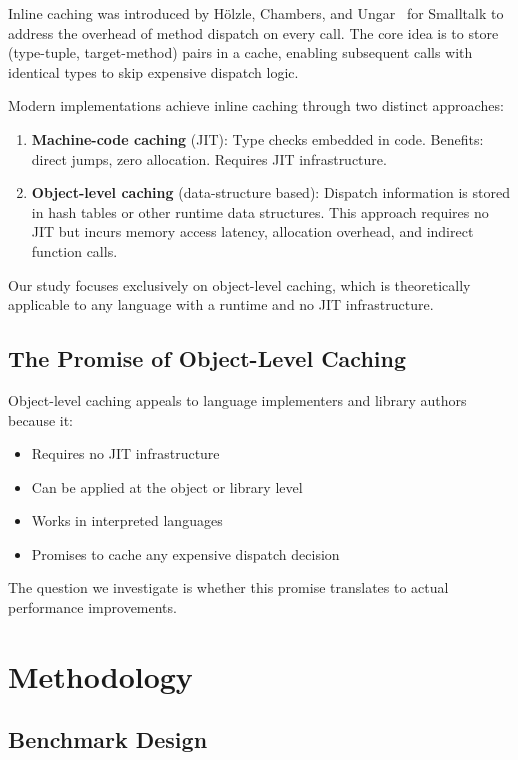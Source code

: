 \documentclass[sigplan,final]{acmart}
\begin{document}
Inline caching was introduced by Hölzle, Chambers, and Ungar~\cite{hoelzle1991optimizing}
for Smalltalk to address the overhead of method dispatch on every call. The core idea is to
store (type-tuple, target-method) pairs in a cache, enabling subsequent calls with identical
types to skip expensive dispatch logic.

Modern implementations achieve inline caching through two distinct approaches:

\begin{enumerate}
  \item \textbf{Machine-code caching} (JIT): Type checks embedded in code. Benefits: direct
    jumps, zero allocation. Requires JIT infrastructure.

  \item \textbf{Object-level caching} (data-structure based): Dispatch information is stored
    in hash tables or other runtime data structures. This approach requires no JIT but incurs
    memory access latency, allocation overhead, and indirect function calls.
\end{enumerate}

Our study focuses exclusively on object-level caching, which is theoretically applicable to any
language with a runtime and no JIT infrastructure.

\subsection{The Promise of Object-Level Caching}

Object-level caching appeals to language implementers and library authors because it:
\begin{itemize}
  \item Requires no JIT infrastructure
  \item Can be applied at the object or library level
  \item Works in interpreted languages
  \item Promises to cache any expensive dispatch decision
\end{itemize}

The question we investigate is whether this promise translates to actual performance improvements.

\section{Methodology}

\subsection{Benchmark Design}
\end{document}
